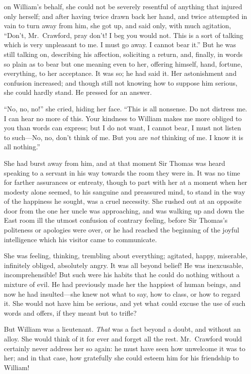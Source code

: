 on William's behalf, she could not be severely resentful
of anything that injured only herself; and after having
twice drawn back her hand, and twice attempted in vain
to turn away from him, she got up, and said only,
with much agitation, ``Don't, Mr.\ Crawford, pray don't! I
beg you would not.  This is a sort of talking which is very
unpleasant to me.  I must go away.  I cannot bear it.''
But he was still talking on, describing his affection,
soliciting a return, and, finally, in words so plain
as to bear but one meaning even to her, offering himself,
hand, fortune, everything, to her acceptance.  It was so;
he had said it.  Her astonishment and confusion increased;
and though still not knowing how to suppose him serious,
she could hardly stand.  He pressed for an answer.

``No, no, no!'' she cried, hiding her face.  ``This is all nonsense.
Do not distress me.  I can hear no more of this.
Your kindness to William makes me more obliged to you
than words can express; but I do not want, I cannot bear,
I must not listen to such---No, no, don't think of me.
But you are \emph{not} thinking of me.  I know it is all nothing.''

She had burst away from him, and at that moment Sir Thomas
was heard speaking to a servant in his way towards the room
they were in.  It was no time for farther assurances
or entreaty, though to part with her at a moment when her
modesty alone seemed, to his sanguine and preassured mind,
to stand in the way of the happiness he sought, was a
cruel necessity.  She rushed out at an opposite door
from the one her uncle was approaching, and was walking
up and down the East room ill the utmost confusion
of contrary feeling, before Sir Thomas's politeness
or apologies were over, or he had reached the beginning
of the joyful intelligence which his visitor came to communicate.

She was feeling, thinking, trembling about everything;
agitated, happy, miserable, infinitely obliged,
absolutely angry.  It was all beyond belief!
He was inexcusable, incomprehensible!  But such were
his habits that he could do nothing without a mixture
of evil.  He had previously made her the happiest
of human beings, and now he had insulted---she knew
not what to say, how to class, or how to regard it.
She would not have him be serious, and yet what could
excuse the use of such words and offers, if they meant but to
trifle?

But William was a lieutenant.  \emph{That} was a fact beyond
a doubt, and without an alloy.  She would think of it
for ever and forget all the rest.  Mr.\ Crawford would
certainly never address her so again:  he must have
seen how unwelcome it was to her; and in that case,
how gratefully she could esteem him for his friendship
to William!

